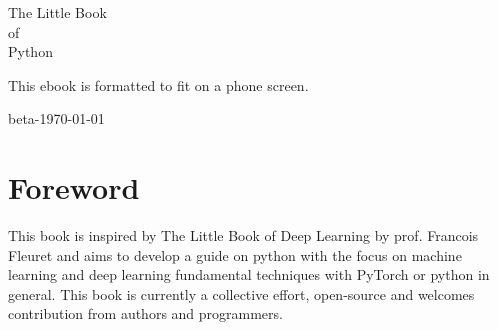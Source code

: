 \documentclass[oneside,11pt]{memoir}
\begin{document}
\thispagestyle{empty}

\begin{center}


{\huge The Little Book\\[0.75ex] of\\[1.75ex] Python}
\vspace*{4ex}



\end{center}

\newpage



This ebook is formatted to fit on a phone screen.


\begin{flushright}
\footnotesize beta-\dotdate\today
\end{flushright}

\vspace*{-3ex}

\newpage


{
\everymath{\color{black}}
\tableofcontents* %
}

\clearpage

\listoffigures*
{}


\chapter*{Foreword}
This book is inspired by The Little Book of Deep Learning by prof. Francois Fleuret \cite{} and aims to develop a guide on python with the focus on machine learning and deep learning fundamental techniques with PyTorch or python in general. This book is currently a collective effort, open-source and welcomes contribution from authors and programmers.
\end{document}
